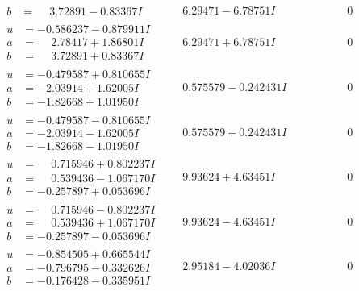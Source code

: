 \documentclass[1p]{elsarticle_modified}
\theoremstyle{definition}
\begin{document}
$$\begin{array}{c|c|c}
\begin{aligned}
b &= \phantom{-}3.72891 - 0.83367 I\end{aligned}
 & \phantom{-}6.29471 - 6.78751 I & \phantom{-0.000000 } 0 \\ \hline\begin{aligned}
u &= -0.586237 - 0.879911 I \\
a &= \phantom{-}2.78417 + 1.86801 I \\
b &= \phantom{-}3.72891 + 0.83367 I\end{aligned}
 & \phantom{-}6.29471 + 6.78751 I & \phantom{-0.000000 } 0 \\ \hline\begin{aligned}
u &= -0.479587 + 0.810655 I \\
a &= -2.03914 + 1.62005 I \\
b &= -1.82668 + 1.01950 I\end{aligned}
 & \phantom{-}0.575579 - 0.242431 I & \phantom{-0.000000 } 0 \\ \hline\begin{aligned}
u &= -0.479587 - 0.810655 I \\
a &= -2.03914 - 1.62005 I \\
b &= -1.82668 - 1.01950 I\end{aligned}
 & \phantom{-}0.575579 + 0.242431 I & \phantom{-0.000000 } 0 \\ \hline\begin{aligned}
u &= \phantom{-}0.715946 + 0.802237 I \\
a &= \phantom{-}0.539436 - 1.067170 I \\
b &= -0.257897 + 0.053696 I\end{aligned}
 & \phantom{-}9.93624 + 4.63451 I & \phantom{-0.000000 } 0 \\ \hline\begin{aligned}
u &= \phantom{-}0.715946 - 0.802237 I \\
a &= \phantom{-}0.539436 + 1.067170 I \\
b &= -0.257897 - 0.053696 I\end{aligned}
 & \phantom{-}9.93624 - 4.63451 I & \phantom{-0.000000 } 0 \\ \hline\begin{aligned}
u &= -0.854505 + 0.665544 I \\
a &= -0.796795 - 0.332626 I \\
b &= -0.176428 - 0.335951 I\end{aligned}
 & \phantom{-}2.95184 - 4.02036 I & \phantom{-0.000000 } 0 \\ \hline\begin{aligned}

\end{aligned}
\end{array}$$
\end{document}
